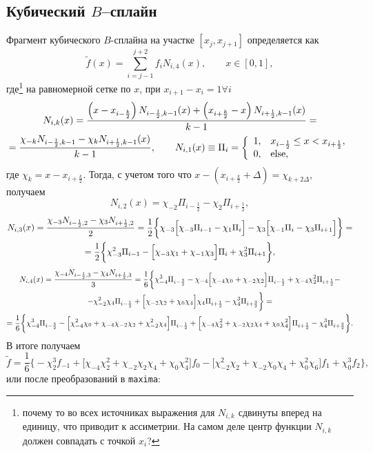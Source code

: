 \subsection{Кубический $B$--сплайн}
Фрагмент кубического $B$-сплайна на участке $[x_j,x_{j+1}]$ определяется как
$$
\widetilde f(x) = \sum_{i=j-1}^{j+2} f_i N_{i,4}(x),\qquad x\in[0,1],
$$
где\footnote{почему то во всех источниках выражения для $N_{i,k}$ сдвинуты вперед на единицу, что приводит к ассиметрии. На самом деле центр функции $N_{i,k}$
  должен совпадать с точкой $x_i$?} на равномерной сетке по $x$, при $x_{i+1}-x_i=1\forall i$
\begin{multline}
  N_{i,k}(x) = \frac{\left(x-x_{i-\frac k2}\right)N_{i-\frac12,k-1}(x) + \left(x_{i+\frac k2}-x\right)N_{i+\frac12,k-1}(x)}{k-1}
  =\\=
\frac{\chi_{-k}N_{i-\frac12,k-1} - \chi_{k}N_{i+\frac12,k-1}(x)}{k-1},
\qquad N_{i,1}(x) \equiv \Pi_i = \left\{\begin{array}{ll} 1,& x_{i-\frac12}\le x<x_{i+\frac12},\\ 0, & \rm else, \end{array}\right.
\notag
\end{multline}
где $\chi_k=x-x_{i+\frac k2}$. Тогда, с учетом того что $x-\left(x_{i+\frac k2}+\Delta\right) = \chi_{k+2\Delta}$, получаем 
$$
N_{i,2}(x) = \chi_{-2}\Pi_{i-\frac12} - \chi_2\Pi_{i+\frac12},
$$
\begin{multline}
  N_{i,3}(x) = \frac{\chi_{-3} N_{i-\frac12,2} -\chi_3 N_{i+\frac12,2}}2
  =\frac12\bigg\{\chi_{-3}\Big[\chi_{-3}\Pi_{i-1} -\chi_1\Pi_{i}\Big] -\chi_3\Big[\chi_{-1}\Pi_{i} -\chi_3\Pi_{i+1}\Big]\bigg\}
  =\\=\frac12\bigg\{\chi_{-3}^2 \Pi_{i-1} - \Big[\chi_{-3}\chi_1 + \chi_{-1}\chi_3\Big]\Pi_{i} +\chi_3^2\Pi_{i+1}\bigg\},
  \notag
\end{multline}
\begin{multline}
  N_{i,4}(x) = \frac{\chi_{-4} N_{i-\frac12,3} -\chi_4 N_{i+\frac12,3}}3 =
  \frac16\bigg\{\chi_{-4}^3 \Pi_{i-\frac32} - \chi_{-4}\Big[\chi_{-4}\chi_0 + \chi_{-2}\chi_2\Big]\Pi_{i-\frac12} +\chi_{-4}\chi_2^2\Pi_{i+\frac12}
  -\\-\chi_{-2}^2\chi_4 \Pi_{i-\frac12} + \Big[\chi_{-2}\chi_2 + \chi_{0}\chi_4\Big]\chi_4\Pi_{i+\frac12} -\chi_4^3\Pi_{i+\frac32}
  \bigg\}=\\=
\frac16\bigg\{\chi_{-4}^3 \Pi_{i-\frac32} - \Big[ \chi_{-4}^2\chi_{0} + \chi_{-4}\chi_{-2}\chi_2 + \chi_{-2}^2\chi_4\Big]\Pi_{i-\frac12} 
  +\Big[ \chi_{-4}\chi_2^2 + \chi_{-2}\chi_2\chi_4 + \chi_0\chi_4^2 \Big]\Pi_{i+\frac12} -\chi_4^3\Pi_{i+\frac32}
  \bigg\}
  .\notag
\end{multline}
В итоге получаем
$$
\widetilde f = \frac16\bigg\{ - \chi_2^3 f_{-1} +\Big[ \chi_{-4}\chi_2^2 + \chi_{-2}\chi_2\chi_4 + \chi_0\chi_4^2 \Big]f_0
-\Big[ \chi_{-2}^2\chi_{2} + \chi_{-2}\chi_{0}\chi_4 + \chi_{0}^2\chi_6 \Big] f_1 +\chi_0^3 f_2 \bigg\},
$$
или после преобразований в \verb'maxima':

